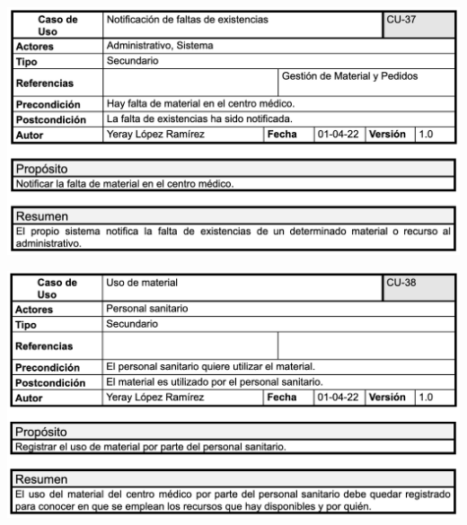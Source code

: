 \documentclass[12pt, spanish]{article}
\begin{document}
\begin{centering}\includegraphics[scale = 0.70]{casos_de_uso/37.png}\\[1.0 cm]\end{centering}
\begin{centering}\includegraphics[scale = 0.70]{casos_de_uso/38.png}\\[1.0 cm]\end{centering}
\end{document}

